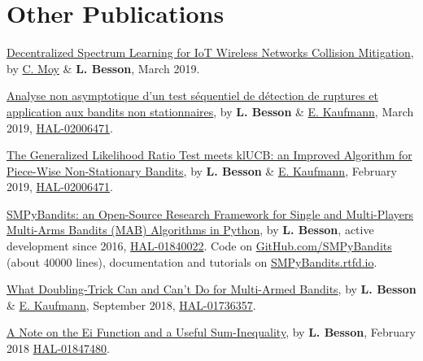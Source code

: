\section*{Other Publications}
\renewcommand{\labelenumi}{[OP-\arabic{enumi}]}
\begin{etaremune}
\item
  \href{https://hal.inria.fr/hal-XXX/document}{Decentralized Spectrum Learning for IoT Wireless Networks Collision Mitigation}, by \href{https://moychris.wordpress.com/}{C. Moy} \& \textbf{L. Besson}, March 2019.
  \cite{MoyBesson2019}
\item
  \href{https://hal.inria.fr/hal-02006471/document}{Analyse non asymptotique d'un test séquentiel de détection de ruptures et application aux bandits non stationnaires}, by \textbf{L. Besson} \&
  \href{http://chercheurs.lille.inria.fr/ekaufman/research.html}{E.
  Kaufmann}, March 2019,
  \href{https://hal.inria.fr/hal-02006471}{HAL-02006471}.
  \cite{Besson2019Gretsi}
\item
  \href{https://hal.inria.fr/hal-02006471/document}{The Generalized Likelihood Ratio Test meets klUCB: an Improved Algorithm for Piece-Wise Non-Stationary Bandits}, by \textbf{L. Besson} \&
  \href{http://chercheurs.lille.inria.fr/ekaufman/research.html}{E.
  Kaufmann}, February 2019,
  \href{https://hal.inria.fr/hal-02006471}{HAL-02006471}.
  \cite{Besson2019GLRT}
\item
	\href{https://hal.inria.fr/hal-01840022/document}{SMPyBandits: an
	Open-Source Research Framework for Single and Multi-Players Multi-Arms
	Bandits (MAB) Algorithms in Python}, by \textbf{L. Besson},
	active development since 2016,
	\href{https://hal.inria.fr/hal-01840022}{HAL-01840022}. Code on
	\href{https://GitHub.com/SMPyBandits/SMPyBandits}{GitHub.com/SMPyBandits}
	(about 40000 lines), documentation and tutorials on
  \href{https://SMPyBandits.rtfd.io}{SMPyBandits.rtfd.io}.
  \cite{SMPyBandits,SMPyBanditsJMLR}
\item
	\href{https://hal.inria.fr/hal-01736357/document}{What Doubling-Trick
	Can and Can't Do for Multi-Armed Bandits}, by \textbf{L. Besson} \&
	\href{http://chercheurs.lille.inria.fr/ekaufman/research.html}{E.
	Kaufmann}, September 2018,
  \href{https://hal.inria.fr/hal-01736357}{HAL-01736357}.
  \cite{Besson2018DoublingTricks}
\item
	\href{https://hal.inria.fr/hal-01847480/document}{A Note on the Ei
	Function and a Useful Sum-Inequality}, by \textbf{L. Besson}, February
  2018 \href{https://hal.inria.fr/hal-01847480}{HAL-01847480}.
\end{etaremune}


